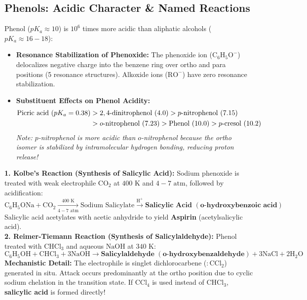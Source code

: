 \documentclass[10pt,a4paper]{article}
\begin{document}
\subsection{Phenols: Acidic Character \& Named Reactions}

\begin{conceptbox}
Phenol ($pK_a \approx 10$) is $10^6$ times more acidic than aliphatic alcohols ($pK_a \approx 16-18$):
\begin{itemize}
  \item \textbf{Resonance Stabilization of Phenoxide:} The phenoxide ion ($\mathrm{C_6H_5O^-}$) delocalizes negative charge into the benzene ring over ortho and para positions (5 resonance structures). Alkoxide ions ($\mathrm{RO^-}$) have zero resonance stabilization.
  \item \textbf{Substituent Effects on Phenol Acidity:}
  \begin{align}
    \text{Picric acid } (pK_a = 0.38) &> 2,4\text{-dinitrophenol } (4.0) > p\text{-nitrophenol } (7.15) \notag \\
    &> o\text{-nitrophenol } (7.23) > \text{Phenol } (10.0) > p\text{-cresol } (10.2)
  \end{align}
  \textit{Note: $p$-nitrophenol is more acidic than $o$-nitrophenol because the ortho isomer is stabilized by intramolecular hydrogen bonding, reducing proton release!}
\end{itemize}
\end{conceptbox}

\begin{formulabox}
\textbf{1. Kolbe's Reaction (Synthesis of Salicylic Acid):}
Sodium phenoxide is treated with weak electrophile $\mathrm{CO_2}$ at $400\text{ K}$ and $4-7\text{ atm}$, followed by acidification:
\begin{equation}
  \mathrm{C_6H_5ONa} + \mathrm{CO_2} \xrightarrow[4-7\text{ atm}]{400\text{ K}} \text{Sodium Salicylate} \xrightarrow{\mathrm{H^+}} \mathbf{\text{Salicylic Acid } (o\text{-hydroxybenzoic acid})}
\end{equation}
Salicylic acid acetylates with acetic anhydride to yield \textbf{Aspirin} (acetylsalicylic acid).\\
\textbf{2. Reimer-Tiemann Reaction (Synthesis of Salicylaldehyde):}
Phenol treated with $\mathrm{CHCl_3}$ and aqueous $\mathrm{NaOH}$ at $340\text{ K}$:
\begin{equation}
  \mathrm{C_6H_5OH} + \mathrm{CHCl_3} + 3\mathrm{NaOH} \longrightarrow \mathbf{\text{Salicylaldehyde } (o\text{-hydroxybenzaldehyde})} + 3\mathrm{NaCl} + 2\mathrm{H_2O}
\end{equation}
\textbf{Mechanistic Detail:} The electrophile is singlet dichlorocarbene ($:\mathrm{CCl_2}$) generated in situ. Attack occurs predominantly at the ortho position due to cyclic sodium chelation in the transition state. If $\mathrm{CCl_4}$ is used instead of $\mathrm{CHCl_3}$, \textbf{salicylic acid} is formed directly!
\end{formulabox}
\end{document}
